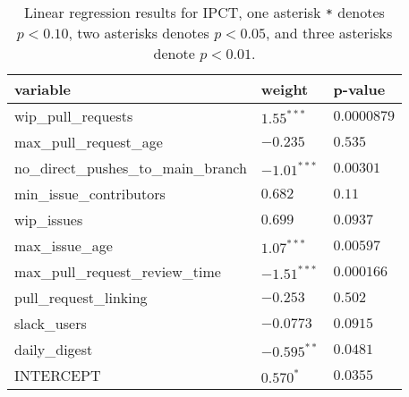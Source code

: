 \renewcommand{\arraystretch}{1.2}
\begin{table}
\begin{center}
\begin{tabular}{|p{6cm}|p{3cm}|p{3cm}|} 
\hline
variable & weight & p-value \\ [0.5ex]
\hline\hline

wip\_pull\_requests & $1.55^{***}$ & $0.0000879$ \\
max\_pull\_request\_age & $-0.235^{}$ & $0.535$ \\
no\_direct\_pushes\_to\_main\_branch & $-1.01^{***}$ & $0.00301$ \\
min\_issue\_contributors & $0.682^{}$ & $0.11$ \\
wip\_issues & $0.699^{}$ & $0.0937$ \\
max\_issue\_age & $1.07^{***}$ & $0.00597$ \\
max\_pull\_request\_review\_time & $-1.51^{***}$ & $0.000166$ \\
pull\_request\_linking & $-0.253^{}$ & $0.502$ \\
slack\_users & $-0.0773^{}$ & $0.0915$ \\
daily\_digest & $-0.595^{**}$ & $0.0481$ \\

\hline\hline
INTERCEPT & $0.570^{*}$ & $0.0355$ \\ 

\hline
\end{tabular}
\caption{Linear regression results for IPCT, one asterisk \texttt{*} denotes  $p < 0.10$, two asterisks denotes $p < 0.05$, and three asterisks denote $p < 0.01$.}
\label{tab:lmipResults}
\end{center}
\end{table}